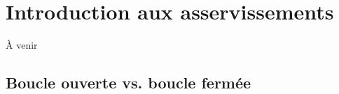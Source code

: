 \chapter{Introduction aux asservissements}

À venir

\section{Boucle ouverte vs. boucle fermée}
\label{sec:BoucleOuverteVsBoucleFermée}


